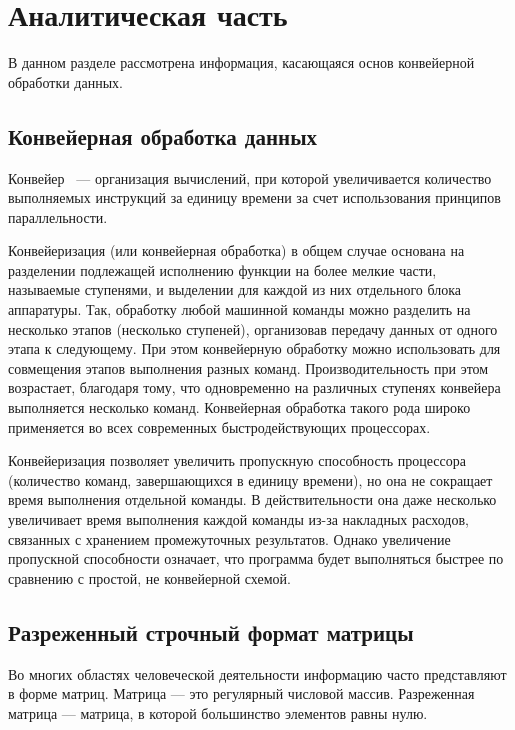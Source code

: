 \chapter{Аналитическая часть}
В данном разделе рассмотрена информация, касающаяся основ конвейерной обработки данных.

\section{Конвейерная обработка данных}
Конвейер~\cite{conway}  --- организация вычислений, при которой увеличивается количество выполняемых инструкций за единицу времени за счет использования принципов параллельности.

Конвейеризация (или конвейерная обработка) в общем случае основана на разделении подлежащей исполнению функции на более мелкие части, называемые ступенями, и выделении для каждой из них отдельного блока аппаратуры. 
Так, обработку любой машинной команды можно разделить на несколько этапов (несколько ступеней), организовав передачу данных от одного этапа к следующему. 
При этом конвейерную обработку можно использовать для совмещения этапов выполнения разных команд. 
Производительность при этом возрастает, благодаря тому, что одновременно на различных ступенях конвейера выполняется несколько команд. 
Конвейерная обработка такого рода широко применяется во всех современных быстродействующих процессорах.

Конвейеризация позволяет увеличить пропускную способность процессора (количество команд, завершающихся в единицу времени), но она не сокращает время выполнения отдельной команды. 
В действительности она даже несколько увеличивает время выполнения каждой команды из-за накладных расходов, связанных с хранением промежуточных результатов. 
Однако увеличение пропускной способности означает, что программа будет выполняться быстрее по сравнению с простой, не конвейерной схемой.


\section{Разреженный строчный формат матрицы}

Во многих областях человеческой деятельности информацию
часто представляют в форме матриц. Матрица --- это регулярный
числовой массив. Разреженная  матрица --- матрица, в которой большинство элементов равны нулю.

